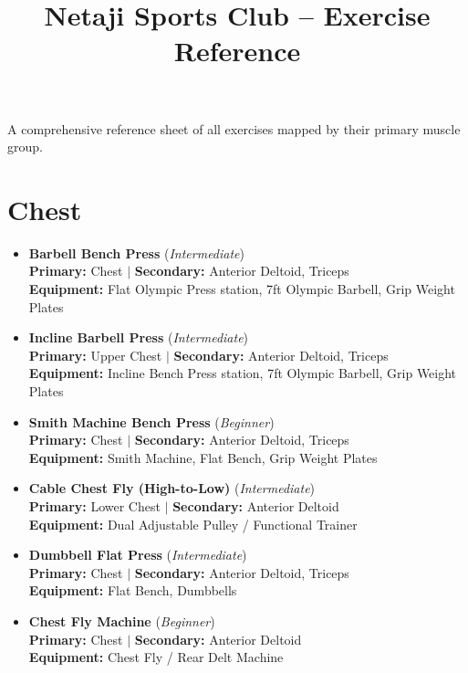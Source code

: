 \documentclass[11pt,a4paper]{article}
\title{\textbf{\color{nscink} Netaji Sports Club -- Exercise Reference}}
\date{}
\author{}
\begin{document}
\maketitle
\vspace{-2em}
\noindent A comprehensive reference sheet of all exercises mapped by their primary muscle group.

\section*{Chest}
\begin{itemize}[leftmargin=*]
  \item \textbf{Barbell Bench Press} (\textit{Intermediate})\\
        \textbf{Primary:} Chest $|$ \textbf{Secondary:} Anterior Deltoid, Triceps\\
        \textbf{Equipment:} Flat Olympic Press station, 7ft Olympic Barbell, Grip Weight Plates
  \item \textbf{Incline Barbell Press} (\textit{Intermediate})\\
        \textbf{Primary:} Upper Chest $|$ \textbf{Secondary:} Anterior Deltoid, Triceps\\
        \textbf{Equipment:} Incline Bench Press station, 7ft Olympic Barbell, Grip Weight Plates
  \item \textbf{Smith Machine Bench Press} (\textit{Beginner})\\
        \textbf{Primary:} Chest $|$ \textbf{Secondary:} Anterior Deltoid, Triceps\\
        \textbf{Equipment:} Smith Machine, Flat Bench, Grip Weight Plates
  \item \textbf{Cable Chest Fly (High-to-Low)} (\textit{Intermediate})\\
        \textbf{Primary:} Lower Chest $|$ \textbf{Secondary:} Anterior Deltoid\\
        \textbf{Equipment:} Dual Adjustable Pulley / Functional Trainer
  \item \textbf{Dumbbell Flat Press} (\textit{Intermediate})\\
        \textbf{Primary:} Chest $|$ \textbf{Secondary:} Anterior Deltoid, Triceps\\
        \textbf{Equipment:} Flat Bench, Dumbbells
  \item \textbf{Chest Fly Machine} (\textit{Beginner})\\
        \textbf{Primary:} Chest $|$ \textbf{Secondary:} Anterior Deltoid\\
        \textbf{Equipment:} Chest Fly / Rear Delt Machine
\end{itemize}
\vspace{0.5em}
\end{document}

